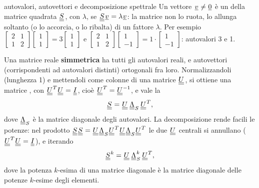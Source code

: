 \begin{richiamo}{autovalori, autovettori e decomposizione spettrale}
Un vettore $\vett{v} \neq \vett{0}$ è un  della matrice quadrata $\matr{S}$, con 
$\lambda$, se $\matr{S}\vett{v} = \lambda\vett{v}$: la matrice non lo ruota, lo allunga soltanto (o lo accorcia, o lo
ribalta) di un fattore $\lambda$. Per esempio $\begin{bmatrix} 2 & 1 \\ 1 & 2 \end{bmatrix} \begin{bmatrix} 1 \\ 1
\end{bmatrix} = 3 \begin{bmatrix} 1 \\ 1 \end{bmatrix}$ e $\begin{bmatrix} 2 & 1 \\ 1 & 2 \end{bmatrix} \begin{bmatrix}
1 \\ -1 \end{bmatrix} = 1 \cdot \begin{bmatrix} 1 \\ -1 \end{bmatrix}$: autovalori 3 e 1.

Una matrice reale \textbf{simmetrica} ha tutti gli autovalori reali, e autovettori (corrispondenti ad autovalori
distinti) ortogonali fra loro. Normalizzandoli (lunghezza 1) e mettendoli come colonne di una matrice $\matr{U}$, si
ottiene una matrice , con $\matr{U}^T \matr{U} = \matr{I}$, cioè $\matr{U}^T = \matr{U}^{-1}$, e vale la
\[ \matr{S} = \matr{U}\, \matr{\Lambda}_S\, \matr{U}^T , \]
dove $\matr{\Lambda}_S$ è la matrice diagonale degli autovalori. La decomposizione rende facili le potenze: nel prodotto
$\matr{S}\matr{S} = \matr{U}\matr{\Lambda}_S \matr{U}^T \matr{U} \matr{\Lambda}_S \matr{U}^T$ le due $\matr{U}$ centrali
si annullano ($\matr{U}^T\matr{U} = \matr{I}$), e iterando
\[ \matr{S}^k = \matr{U}\, \matr{\Lambda}_S^k\, \matr{U}^T , \]
dove la potenza $k$-esima di una matrice diagonale è la matrice diagonale delle potenze $k$-esime degli elementi.
\end{richiamo}


